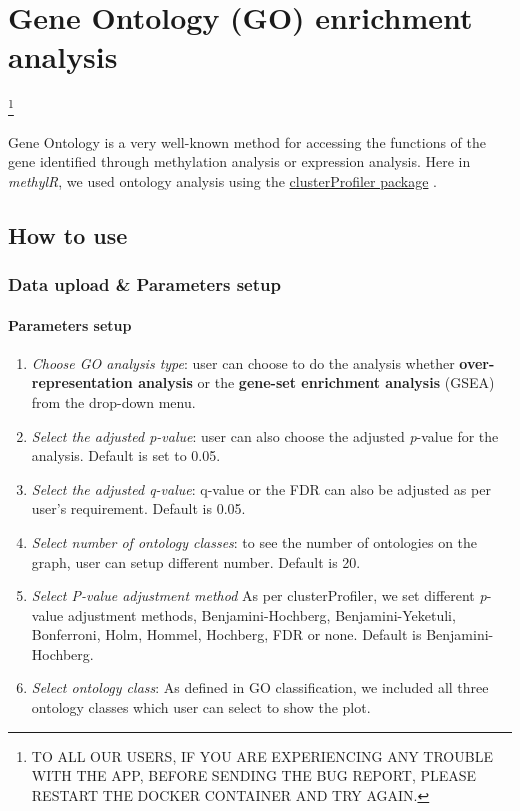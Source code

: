 \documentclass[
  a4paper,
  DIV=11,
  numbers=noendperiod,
  oneside,
  open=any]{scrreport}
\providecommand{\tightlist}{%
  \setlength{\itemsep}{0pt}\setlength{\parskip}{0pt}}\usepackage{longtable,booktabs,array}
\begin{document}
\chapter{Gene Ontology (GO) enrichment analysis}\label{sec-go}

\footnote{TO ALL OUR USERS, IF YOU ARE EXPERIENCING ANY TROUBLE WITH THE
  APP, BEFORE SENDING THE BUG REPORT, PLEASE RESTART THE DOCKER
  CONTAINER AND TRY AGAIN.}

Gene Ontology is a very well-known method for accessing the functions of
the gene identified through methylation analysis or expression analysis.
Here in \emph{methylR}, we used ontology analysis using the
\href{https://bioconductor.org/packages/release/bioc/html/clusterProfiler.html}{clusterProfiler
package} \autocite{yu2012clusterprofiler,wu2021clusterprofiler}.

\section{How to use}\label{how-to-use-7}

\subsection{Data upload \& Parameters
setup}\label{data-upload-parameters-setup-4}

\subsubsection{Parameters setup}\label{parameters-setup-1}

\begin{enumerate}
\def\labelenumi{\arabic{enumi}.}
\tightlist
\item
  \emph{Choose GO analysis type}: user can choose to do the analysis
  whether \textbf{over-representation analysis} or the \textbf{gene-set
  enrichment analysis} (GSEA) from the drop-down menu.
\item
  \emph{Select the adjusted p-value}: user can also choose the adjusted
  \emph{p}-value for the analysis. Default is set to 0.05.
\item
  \emph{Select the adjusted q-value}: q-value or the FDR can also be
  adjusted as per user's requirement. Default is 0.05.
\item
  \emph{Select number of ontology classes}: to see the number of
  ontologies on the graph, user can setup different number. Default is
  20.
\item
  \emph{Select P-value adjustment method} As per clusterProfiler, we set
  different \emph{p}-value adjustment methods, Benjamini-Hochberg,
  Benjamini-Yeketuli, Bonferroni, Holm, Hommel, Hochberg, FDR or none.
  Default is Benjamini-Hochberg.
\item
  \emph{Select ontology class}: As defined in GO classification, we
  included all three ontology classes which user can select to show the
  plot.
\end{enumerate}
\end{document}
